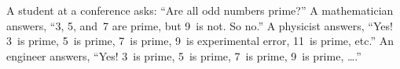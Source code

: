 \documentclass[twocolumn]{article}
\begin{document}
A student at a conference asks: ``Are all odd numbers prime?''
A mathematician answers, ``3, 5, and~7 are prime, but 9~is
not.  So no.''
A physicist answers, ``Yes!  3~is prime, 5~is prime, 7~is prime, 9~is
experimental error, 11~is prime, etc.''
An engineer answers, ``Yes!  3~is prime, 5~is prime, 7~is prime, 9~is
prime, \ldots.''


\end{document}
